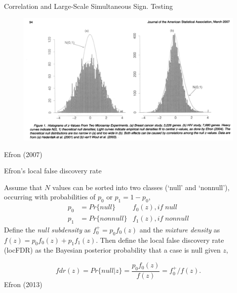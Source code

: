 \documentclass[ignorenonframetext,aspectratio=169,]{beamer}
\begin{document}
\begin{frame}{%
\protect\hypertarget{correlation-and-large-scale-simultaneous-sign.-testing}{%
Correlation and Large-Scale Simultaneous Sign. Testing}}

\begin{figure}[htb]
  \centering
\includegraphics[keepaspectratio,width=\textwidth,height=0.75\textheight]{../n1pas/figures/Efron2007_figure1.png}
   \end{figure}

Efron (2007)

\end{frame}

\begin{frame}{%
\protect\hypertarget{efrons-local-false-discovery-rate}{%
Efron’s local false discovery rate}}

Assume that \(N\) values can be sorted into two classes (‘null’ and
‘nonnull’), occurring with probabilities of \(p_{0}\) or
\(p_{1}=1-p_{0}\), \begin{align*}
     p_{0} & = Pr\{null\} & f_{0}(z), if \; null \\
     p_{1} & = Pr\{nonnull\} & f_{1}(z), if \; nonnull
   \end{align*} Define the \emph{null subdensity} as
\(f^{+}_{0}=p_{0}f_{0}(z)\) and the \emph{mixture density} as
\(f(z)=p_{0}f_{0}(z) + p_{1}f_{1}(z)\). Then define the local false
discovery rate (locFDR) as the Bayesian posterior probability that a
case is null given \(z\),

\begin{equation*}
fdr(z) = Pr\{null | z \} = \frac{p_{0}f_{0}(z)}{f(z)}= f^{+}_{0}/f(z).
     \end{equation*} Efron (2013)

\end{frame}
\end{document}
